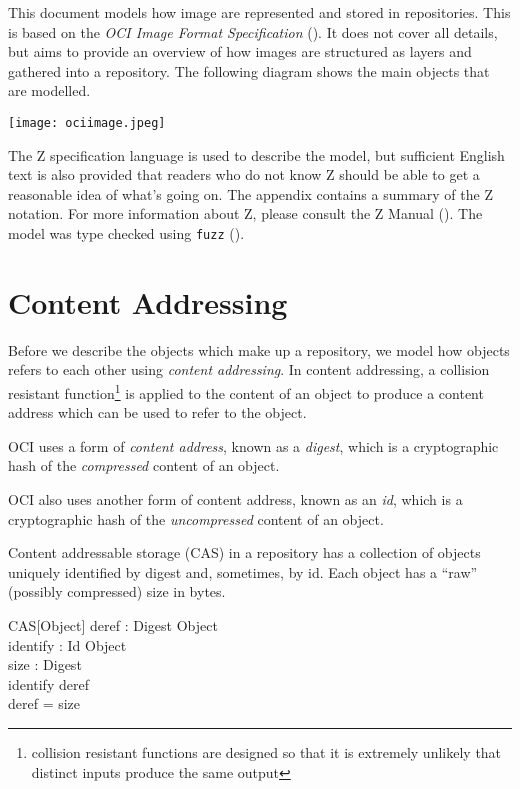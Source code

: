\documentclass[a4paper,twoside,12pt]{article}
\begin{document}
This document models how image are represented and stored in repositories. This is based on the \textit{OCI Image Format Specification} (\cite{ociimage}). It does not cover all details, but aims to provide an overview of how images are structured as layers and gathered into a repository. The following diagram shows the main objects that are modelled.

\texttt{[image: ociimage.jpeg]}

The Z specification language is used to describe the model, but sufficient English text is also provided that readers who do not know Z should be able to get a reasonable idea of what's going on. The appendix contains a summary of the Z notation.
For more information about Z, please consult the Z Manual (\cite{zman}).
The model was type checked using \texttt{fuzz} (\cite{fuzz}).

\newpage
\section{Content Addressing}

Before we describe the objects which make up a repository, we model how objects refers to each other using \textit{content addressing}.
In content addressing, a collision resistant function\footnote{collision resistant functions are designed so that it is extremely unlikely that distinct inputs produce the same output} is applied to the content of an object to produce a content address which can be used to refer to the object.

OCI uses a form of \textit{content address}, known as a \textit{digest}, which is a cryptographic hash of the \textit{compressed} content of an object.
\begin{zed}
[ Digest ] 
\end{zed}

OCI also uses another form of content address, known as an \textit{id}, which is a cryptographic hash of the \textit{uncompressed} content of an object.
\begin{zed}
[ Id ] 
\end{zed}

Content addressable storage (CAS) in a repository has a collection of objects uniquely identified by digest and, sometimes, by id. Each object has a ``raw'' (possibly compressed) size in bytes.
\begin{schema}{CAS}[Object]
  deref : Digest \pinj Object \\
  identify : Id \pinj Object \\
  size : Digest \pfun \nat \\
\where
  \ran identify \subseteq \ran deref \\
  \dom deref = \dom size \\
\end{schema}
\end{document}
